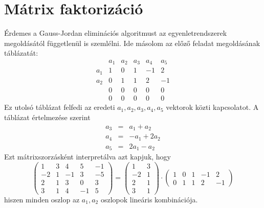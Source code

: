\documentclass[9pt, showtrims]{memoir}
\theoremstyle{plain}
\theoremstyle{remark}
\theoremstyle{definition}
\begin{document}
\section{Mátrix faktorizáció}
Érdemes a Gauss-Jordan eliminációs algoritmust az egyenletrendszerek megoldásától függetlenül is szemlélni.
Ide másolom az előző feladat megoldásának táblázatát:
\[
        \begin{array}{r|rrrrr}
            &a_1&a_2&a_3&a_4&a_5\\
            \hline
            a_1&1&0&1&-1&2\\
            a_2&0&1&1&2&-1\\
            &0&0&0&0&0\\
            &0&0&0&0&0
        \end{array}
\]
Ez utolsó táblázat felfedi az eredeti $a_1,a_2,a_3,a_4,a_5$ vektorok közti kapcsolatot.
A táblázat értelmezése szerint
\begin{eqnarray*}
    a_3&=& a_1+a_2\\
    a_4&=& -a_1+2a_2\\
    a_5&=& 2a_1-a_2
\end{eqnarray*}
Ezt mátrixszorzásként interpretálva azt kapjuk, hogy
\[
    \begin{pmatrix}
        1&3&4&5&-1\\
        -2&1&-1&3&-5\\
        2&1&3&0&3\\
        3&1&4&-1&5
    \end{pmatrix}
    =
    \begin{pmatrix}
        1&3\\
        -2&1\\
        2&1\\
        3&1
    \end{pmatrix}
    \cdot
    \begin{pmatrix}
        1&0&1&-1&2\\
        0&1&1&2&-1
    \end{pmatrix}
\]
hiszen minden oszlop az $a_1,a_2$ oszlopok lineáris kombinációja.
\end{document}
